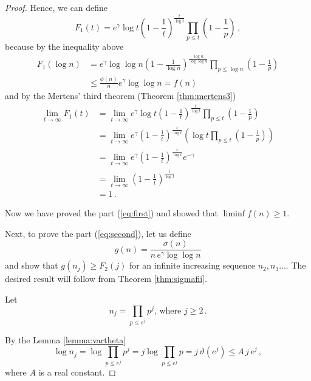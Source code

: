 \documentclass{article}
\begin{document}
\begin{theorem}
\begin{proof}
Hence, we can define
\begin{equation*}
    F_1(t)=e^\gamma \log t \left(1-\frac{1}{t}\right)^\frac{t}{\log t} \prod_{p\leq t} \left(1-\frac{1}{p}\right)\,,
\end{equation*}
because by the inequality above
\begin{align*}
    F_1(\log n) & = e^\gamma \log \log n \left(1-\frac{1}{\log n}\right)^\frac{\log n}{\log \log n} \prod_{p\leq \log n} \left(1-\frac{1}{p}\right)\\
    & \leq \frac{\phi(n)}{n} e^\gamma \log\log n = f(n)
\end{align*}
and by the Mertens' third theorem (Theorem \ref{thm:mertens3})
\begin{align*}
    \lim_{t \rightarrow \infty} F_1(t) & = \lim_{t \rightarrow \infty} e^\gamma \log t \left(1-\frac{1}{t}\right)^\frac{t}{\log t} \prod_{p\leq t} \left(1-\frac{1}{p}\right)\\
    & = \lim_{t \rightarrow \infty} e^\gamma \left( 1-\frac{1}{t}\right)^\frac{t}{\log t} \left(\log t \prod_{p\leq t} \left(1-\frac{1}{p}\right) \right)\\
    & = \lim_{t \rightarrow \infty} e^\gamma \left( 1-\frac{1}{t}\right)^\frac{t}{\log t} e^{-\gamma}\\
    & = \lim_{t \rightarrow \infty} \left( 1-\frac{1}{t}\right)^\frac{t}{\log t}\\
    & = 1\,.
\end{align*}

Now we have proved the part (\ref{eq:first}) and showed that
$\liminf{f(n)}\geq 1$.

Next, to prove the part (\ref{eq:second}), let us define
\begin{equation*}
    g(n)=\frac{\sigma(n)}{n\,e^\gamma \log\log n}
\end{equation*}
and show that $g(n_j) \geq F_2(j)$ for an infinite increasing sequence $n_2,n_3\dots$. The desired result will follow from Theorem \ref{thm:sigmafii}.

Let
\begin{equation*}
    n_j=\prod_{p\leq e^j} p^j\text{, where } j\geq 2\,.
\end{equation*}

By the Lemma \ref{lemma:vartheta}
\begin{equation*}
    \log n_j = \log \prod_{p\leq e^j} p^j = j \log \prod_{p\leq e^j} p = j\,\vartheta(e^j) \leq A\,j\,e^j\,,
\end{equation*}
where $A$ is a real constant.


\end{proof}
\end{theorem}
\end{document}
